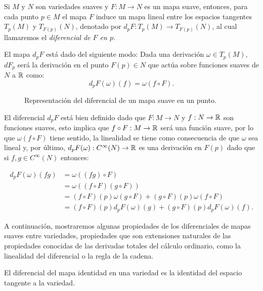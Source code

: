 \begin{definition}
	Si $M$ y $N$ son variedades suaves y $F: M \to N$ es un mapa suave, entonces, para cada punto $p \in M$ el mapa $F$ induce un mapa lineal entre los espacios tangentes $T_p(M)$ y $T_{F(p)}(N)$, denotado por $d_pF: T_p(M) \to T_{F(p)}(N)$, al cual llamaremos el \it{diferencial de $F$ en $p$}.

	El mapa $d_pF$ está dado del siguiente modo: Dada una derivación $\omega \in T_p(M)$, $dF_p$ será la derivación en el punto $F(p) \in N$ que actúa sobre funciones suaves de $N$ a $\mathbb{R}$ como:
	\[ d_pF(\omega)(f) = \omega(f \circ F). \]
\end{definition}

\begin{figure}[h]
	\centering
	
	\caption{Representación del diferencial de un mapa suave en un punto.}
\end{figure}

El diferencial $d_pF$ está bien definido dado que $F: M \to N$ y $f: N \to \mathbb{R}$ son funciones suaves, esto implica que $f \circ F: M \to \mathbb{R}$ será una función suave, por lo que $\omega(f \circ F)$ tiene sentido, la linealidad se tiene como consecuencia de que $\omega$ sea lineal y, por último, $d_pF(\omega): C^{\infty}(N) \to \mathbb{R}$ es una derivación en $F(p)$ dado que si $f, g \in C^{\infty}(N)$ entonces:

\begin{align*}
	d_pF(\omega)(fg) & = \omega((fg) \circ F)                                               \\
	                 & = \omega((f \circ F)(g \circ F))                                     \\
	                 & = (f \circ F)(p)\omega(g \circ F) + (g \circ F)(p) \omega(f \circ F) \\
	                 & = (f \circ F)(p)d_pF(\omega)(g) + (g \circ F)(p)d_pF(\omega)(f).
\end{align*}

A continuación, mostraremos algunas propiedades de los diferenciales de mapas suaves entre variedades, propiedades que son extensiones naturales de las propiedades conocidas de las derivadas totales del cálculo ordinario, como la linealidad del diferencial o la regla de la cadena.

\begin{lemma}\label{Lemma: Diferencial del Mapa Identidad}
	El diferencial del mapa identidad en una variedad es la identidad del espacio tangente a la variedad.
\end{lemma}

